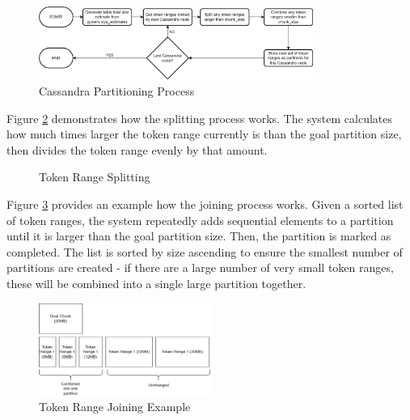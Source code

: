 \begin{figure}[h]
	\centering
	\includegraphics[width=0.8\textwidth]{chapters/diagrams/implementation/cassandra-partitioning-decision-tree}
	\caption{Cassandra Partitioning Process}
	\label{fig:cassandra-partitioning-decision-tree}
\end{figure}


Figure \ref{fig:cassandra-split-process} demonstrates how the splitting process works. The system calculates how much times larger the token range currently is than the goal partition size, then divides the token range evenly by that amount.

\begin{figure}[h]
	\centering
	\qquad
	\caption{Token Range Splitting}
	\label{fig:cassandra-split-process}
\end{figure}

Figure \ref{fig:cassandra-join-process} provides an example how the joining process works. Given a sorted list of token ranges, the system repeatedly adds sequential elements to a partition until it is larger than the goal partition size. Then, the partition is marked as completed. The list is sorted by size ascending to ensure the smallest number of partitions are created - if there are a large number of very small token ranges, these will be combined into a single large partition together.

\begin{figure}[h]
	\centering
	\includegraphics[width=0.5\textwidth]{chapters/diagrams/implementation/cassandra-join-example}
	\caption{Token Range Joining Example}
	\label{fig:cassandra-join-process}
\end{figure}

